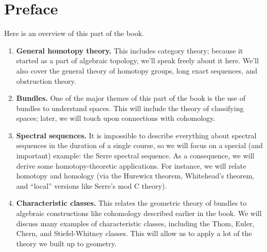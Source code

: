 
\section{Preface}



Here is an overview of this part of the book.
\begin{enumerate}
    \item \textbf{General homotopy theory.} This includes category theory;
	because it started as a part of algebraic topology, we'll speak freely
	about it here.  We'll also cover the general theory of homotopy groups,
	long exact sequences, and obstruction theory.
    \item \textbf{Bundles.} One of the major themes of this part of the book is
	the use of bundles to understand spaces.  This will include the theory
	of classifying spaces; later, we will touch upon connections with
	cohomology.
    \item \textbf{Spectral sequences.} It is impossible to describe everything
	about spectral sequences in the duration of a single course, so we will
	focus on a special (and important) example: the Serre spectral
	sequence.  As a consequence, we will derive some homotopy-theoretic
	applications.  For instance, we will relate homotopy and homology (via
	the Hurewicz theorem, Whitehead's theorem, and ``local'' versions like
	Serre's mod C theory).
    \item \textbf{Characteristic classes.} This relates the geometric theory of
	bundles to algebraic constructions like cohomology described earlier in
	the book.  We will discuss many examples of characteristic classes,
	including the Thom, Euler, Chern, and Stiefel-Whitney classes.  This
	will allow us to apply a lot of the theory we built up to geometry.

\end{enumerate}
